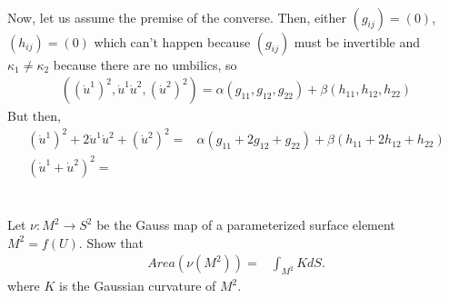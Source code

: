 \documentclass[12pt]{amsart}
\begin{document}
\\
\par Now, let us assume the premise of the converse. Then, either $(g_{ij})=(0)$, $(h_{ij})=(0)$ which can't happen because $(g_{ij})$ must be invertible and $\kappa_1\neq\kappa_2$ because there are no umbilics, so
\begin{align*}
	((\dot u^1)^2,\dot u^1\dot u^2,(\dot u^2)^2)=\alpha(g_{11},g_{12},g_{22})+\beta(h_{11},h_{12},h_{22})
\end{align*}
But then,
\begin{align*}
	(\dot u^1)^2+2\dot u^1\dot u^2+(\dot u^2)^2=&\alpha(g_{11}+2g_{12}+g_{22})+\beta(h_{11}+2h_{12}+h_{22})
	\\(\dot u^1+\dot u^2)^2=&
\end{align*}

\newpage
\section{}Let $\nu:M^2\to S^2$ be the Gauss map of a parameterized surface element $M^2=f(U)$. Show that
\begin{align*}
	Area(\nu(M^2))=&\int_{M^2}KdS.
\end{align*}
where $K$ is the Gaussian curvature of $M^2$.

\newpage
\end{document}
